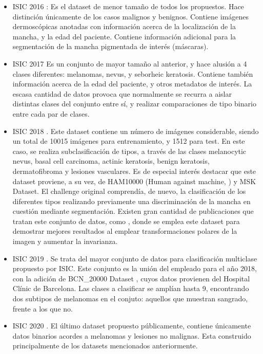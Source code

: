 \begin{itemize}
	
	\item ISIC 2016 \cite{gutman2016skin}:  Es el dataset de menor tamaño de todos los propuestos. Hace distinción únicamente de los casos malignos y benignos. Contiene imágenes dermoscópicas anotadas con información acerca de la localización de la mancha, y la edad del paciente. Contiene información adicional para la segmentación de la mancha pigmentada de interés (máscaras).
	\item ISIC 2017 \cite{codella2018skin} Es un conjunto de mayor tamaño al anterior, y hace alusión a 4 clases diferentes: melanomas, nevus, y seborheic keratosis. Contiene también información acerca de la edad del paciente, y otros metadatos de interés. La escasa cantidad de datos provoca que normalmente se recurra a aislar distintas clases del conjunto entre sí, y realizar comparaciones de tipo binario entre cada par de clases.
	\item ISIC 2018 \cite{ham10000,codella2018skin,combalia2019bcn20000}. Este dataset contiene un número de imágenes considerable, siendo un total de 10015 imágenes para entrenamiento, y 1512 para test. En este caso, se realiza subclasificación de tipos, a través de las clases melanocytic nevus, basal cell carcinoma, actinic keratosis, benign keratosis, dermatofibroma y lesiones vasculares. Es de especial interés destacar que este dataset proviene, a su vez, de HAM10000 (Human against machine, \cite{ham10000} )  y MSK Dataset. El challenge original comprendía, de nuevo, la clasificación de los diferentes tipos realizando previamente una discriminación de la mancha en cuestión mediante segmentación. Existen gran cantidad de publicaciones que tratan este conjunto de datos, como \cite{benvcevic2021training}, donde se emplea este dataset para demostrar mejores resultados al emplear transformaciones polares de la imagen y aumentar la invarianza.
	
	\item ISIC 2019 \cite{ham10000,codella2018skin,combalia2019bcn20000}.  Se trata del mayor conjunto de datos para clasificación multiclase propuesto por ISIC. Este conjunto es la unión del empleado para el año 2018, con la adición de BCN\_20000 Dataset \cite{combalia2019bcn20000}, cuyos datos provienen del Hospital Clínic de Barcelona. Las clases a clasificar se amplían hasta 9, encontrando dos subtipos de melanomas en el conjuto: aquellos que muestran sangrado, frente a los que no.
	\item ISIC 2020 \cite{Rotemberg_2021}. El último dataset propuesto públicamente, contiene únicamente datos binarios acordes a melanomas y lesiones no malignas. Esta construido principalmente de los datasets mencionados anteriormente.
\end{itemize}

